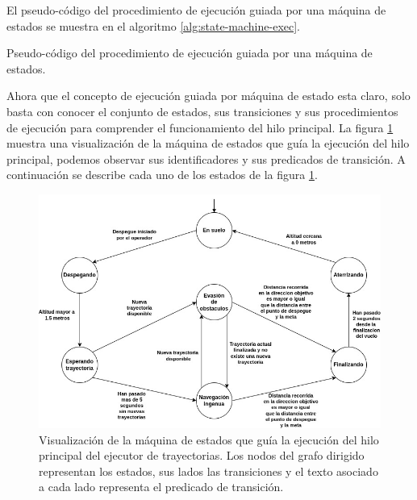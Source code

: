 El pseudo-código del procedimiento de ejecución guiada por una máquina de estados se muestra en el algoritmo \ref{alg:state-machine-exec}.

\begin{algorithm}
\caption{Pseudo-código del procedimiento de ejecución guiada por una máquina de estados. }
\label{alg:state-machine-exec}


\end{algorithm}

Ahora que el concepto de ejecución guiada por máquina de estado esta claro, solo basta con conocer el conjunto de estados, sus transiciones y sus procedimientos de ejecución para comprender el funcionamiento del hilo principal. La figura \ref{fig:state-machine} muestra una visualización de la máquina de estados que guía la ejecución del hilo principal, podemos observar sus identificadores y sus predicados de transición. A continuación se describe cada uno de los estados de la figura \ref{fig:state-machine}. 

\begin{figure}[H]
    \centering
    \includegraphics[scale=0.54]{partes/img/State Machine.jpg}
    \caption[Visualización de la máquina de estados que guía la ejecución del hilo principal del ejecutor de trayectorias.]{Visualización de la máquina de estados que guía la ejecución del hilo principal del ejecutor de trayectorias. Los nodos del grafo dirigido representan los estados, sus lados las transiciones y el texto asociado a cada lado representa el predicado de transición.}
    \label{fig:state-machine}
\end{figure}

